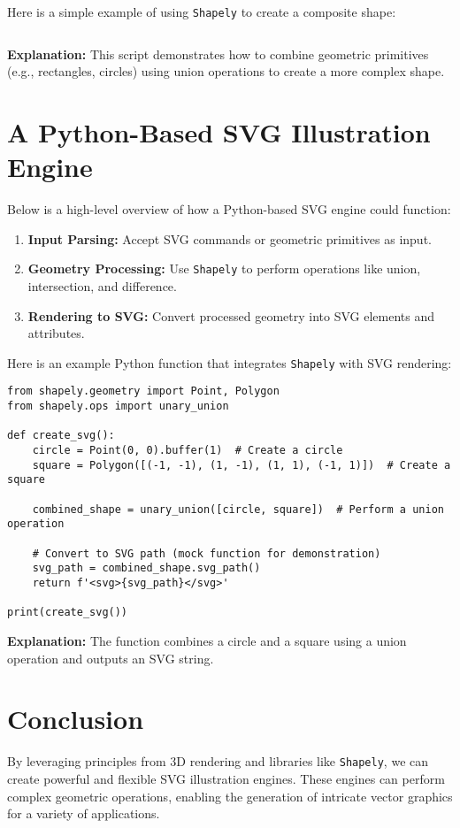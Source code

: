 Here is a simple example of using \texttt{Shapely} to create a composite shape:

\inputminted{python}{rendering/shading/masking.py}

\textbf{Explanation:} This script demonstrates how to combine geometric primitives (e.g., rectangles, circles) using union operations to create a more complex shape.

\section{A Python-Based SVG Illustration Engine}
Below is a high-level overview of how a Python-based SVG engine could function:

\begin{enumerate}
    \item \textbf{Input Parsing:} Accept SVG commands or geometric primitives as input.
    \item \textbf{Geometry Processing:} Use \texttt{Shapely} to perform operations like union, intersection, and difference.
    \item \textbf{Rendering to SVG:} Convert processed geometry into SVG elements and attributes.
\end{enumerate}

Here is an example Python function that integrates \texttt{Shapely} with SVG rendering:

\begin{verbatim}
from shapely.geometry import Point, Polygon
from shapely.ops import unary_union

def create_svg():
    circle = Point(0, 0).buffer(1)  # Create a circle
    square = Polygon([(-1, -1), (1, -1), (1, 1), (-1, 1)])  # Create a square

    combined_shape = unary_union([circle, square])  # Perform a union operation

    # Convert to SVG path (mock function for demonstration)
    svg_path = combined_shape.svg_path()
    return f'<svg>{svg_path}</svg>'

print(create_svg())
\end{verbatim}

\textbf{Explanation:} The function combines a circle and a square using a union operation and outputs an SVG string.

\section{Conclusion}
By leveraging principles from 3D rendering and libraries like \texttt{Shapely}, we can create powerful and flexible SVG illustration engines. These engines can perform complex geometric operations, enabling the generation of intricate vector graphics for a variety of applications.
